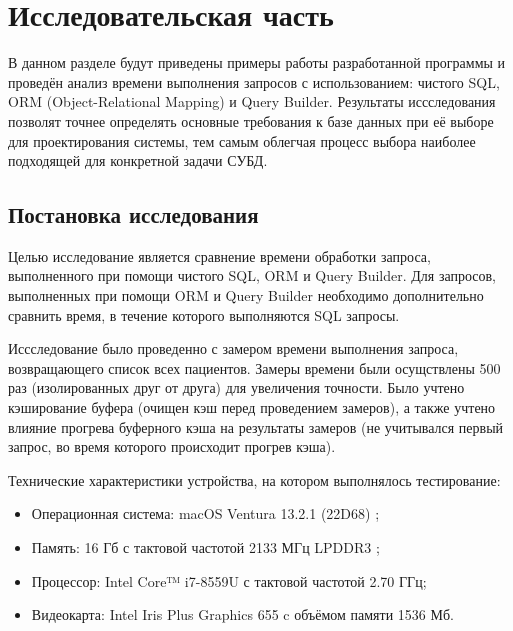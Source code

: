 \section{\large Исследовательская часть}
\label{cha:research}

В данном разделе будут приведены примеры работы разработанной программы и проведён анализ времени выполнения запросов с использованием: чистого SQL, ORM (Object-Relational Mapping) и Query Builder. Результаты иссследования позволят точнее определять основные требования к базе данных при её выборе для проектирования системы, тем самым облегчая процесс выбора наиболее подходящей для конкретной задачи СУБД.	


\subsection{Постановка исследования}

Целью исследование является сравнение времени обработки запроса, выполненного при помощи чистого SQL, ORM и Query Builder. Для запросов, выполненных при помощи ORM и Query Builder необходимо дополнительно сравнить время, в течение которого выполняются SQL запросы.

Иссследование было проведенно с замером времени выполнения запроса, возвращающего список всех пациентов. Замеры времени были осущствлены 500 раз (изолированных друг от друга) для увеличения точности. Было учтено кэширование буфера (очищен кэш перед проведением замеров), а также учтено влияние прогрева буферного кэша на результаты замеров (не учитывался первый запрос, во время которого происходит прогрев кэша).

Технические характеристики устройства, на котором выполнялось тестирование:

\begin{itemize}[label=---]
	\item Операционная система: macOS Ventura 13.2.1 (22D68) \cite{macos};
	\item Память: 16 Гб с тактовой частотой 2133 МГц LPDDR3 \cite{memory};
	\item Процессор: Intel Core™ i7-8559U \cite{intel} с тактовой частотой  2.70 ГГц;
	\item Видеокарта: Intel Iris Plus Graphics 655 \cite{graphics} c объёмом памяти 1536 Мб.
\end{itemize}

